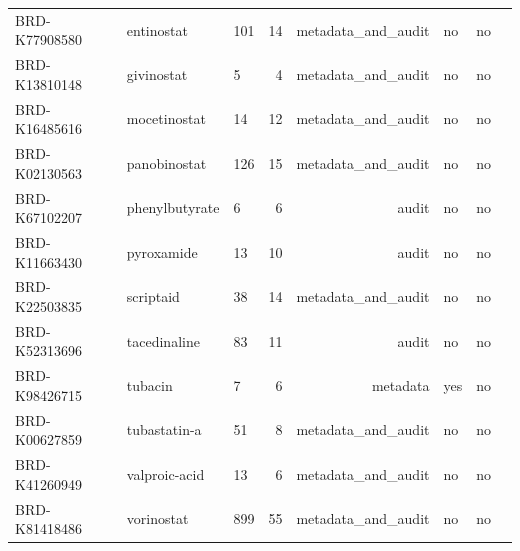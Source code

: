 \begin{longtable}{@{}lllrrlll@{}}
BRD-K77908580 & entinostat & 101 & 14 & metadata\_and\_audit & no & no \\
BRD-K13810148 & givinostat & 5 & 4 & metadata\_and\_audit & no & no \\
BRD-K16485616 & mocetinostat & 14 & 12 & metadata\_and\_audit & no & no \\
BRD-K02130563 & panobinostat & 126 & 15 & metadata\_and\_audit & no & no \\
BRD-K67102207 & phenylbutyrate & 6 & 6 & audit & no & no \\
BRD-K11663430 & pyroxamide & 13 & 10 & audit & no & no \\
BRD-K22503835 & scriptaid & 38 & 14 & metadata\_and\_audit & no & no \\
BRD-K52313696 & tacedinaline & 83 & 11 & audit & no & no \\
BRD-K98426715 & tubacin & 7 & 6 & metadata & yes & no \\
BRD-K00627859 & tubastatin-a & 51 & 8 & metadata\_and\_audit & no & no \\
BRD-K41260949 & valproic-acid & 13 & 6 & metadata\_and\_audit & no & no \\
BRD-K81418486 & vorinostat & 899 & 55 & metadata\_and\_audit & no & no \\
\end{longtable}
\endgroup
